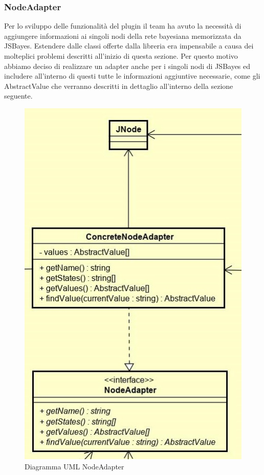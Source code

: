 \subsubsection{NodeAdapter}
Per lo sviluppo delle funzionalità del plugin il team ha avuto la necessità di aggiungere informazioni ai singoli nodi della rete bayesiana memorizzata da JSBayes.
Estendere dalle classi offerte dalla libreria era impensabile a causa dei molteplici problemi descritti all'inizio di questa sezione. Per questo motivo abbiamo deciso di realizzare un adapter anche per i singoli nodi di JSBayes ed includere all'interno di questi tutte le informazioni aggiuntive necessarie, come gli AbstractValue che verranno descritti in dettaglio all'interno della sezione seguente.
\begin{figure} [H]
	\centering
	\includegraphics[scale=0.7]{Img/NodeAdapter}
	\caption{Diagramma UML NodeAdapter}\label{}
\end{figure}
